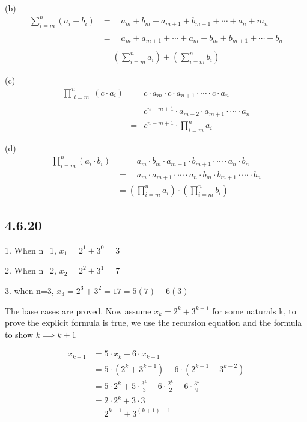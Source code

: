 \documentclass{article}
\begin{document}
(b) $$\begin{aligned}\sum_{i=m}^n\left(a_i+b_i\right)&=\quad a_m+b_m+a_{m+1}+b_{m+1}+\cdots+a_n+m_n\\\\&=\quad a_m+a_{m+1}+\cdots+a_m+b_m+b_{m+1}+\cdots+b_n\\\\&=\left(\sum_{i=m}^na_i\right)+\left(\sum_{i=m}^nb_i\right)\end{aligned}$$

(c) $$\begin{aligned}\prod_{\begin{array}{rcl}i=m\\\end{array}}^{n}(c\cdot a_{i})&=&c\cdot a_{m}\cdot c\cdot a_{n+1}\cdot\cdots\cdot c\cdot a_{n}\\&=&c^{n-m+1}\cdot a_{m-2}\cdot a_{m+1}\cdot\cdots\cdot a_{n}\\&=&c^{n-m+1}\cdot\prod_{i=m}^{n}a_{i}\end{aligned}$$

(d) $$\begin{aligned}\prod_{i=m}^n\left(a_i\cdot b_i\right)&=\quad a_m\cdot b_m\cdot a_{m+1}\cdot b_{m+1}\cdot\cdots\cdot a_n\cdot b_n\\&=\quad a_m\cdot a_{m+1}\cdot\cdots\cdot a_n\cdot b_m\cdot b_{m+1}\cdot\cdots\cdot b_n\\&=\left(\prod_{i=m}^na_i\right)\cdot\left(\prod_{i=m}^nb_i\right)\end{aligned}$$

\subsection*{4.6.20}

1. When n=1, $x_1=2^1+3^0=3$ \checkmark

2. When n=2, $x_2=2^2+3^1=7$ \checkmark

3. when n=3, $x_3=2^3+3^2=17=5(7)-6(3)$ \checkmark

The base cases are proved. Now assume $x_k=2^k+3^{k-1}$ for some naturals k, to prove the explicit formula is true, we use the recursion equation and the formula to show $k \implies k+1$

$$\begin{aligned}x_{k+1}&=5\cdot x_{k}-6\cdot x_{k-1}\\&=5\cdot\left(2^{k}+3^{k-1}\right)-6\cdot\left(2^{k-1}+3^{k-2}\right)\\&=5\cdot2^{k}+5\cdot\frac{3^{k}}{3}-6\cdot\frac{2^{k}}{2}-6\cdot\frac{3^{k}}{9}\\&=2\cdot2^{k}+3\cdot3\\&=2^{k+1}+3^{(k+1)-1}\end{aligned}$$
\end{document}
